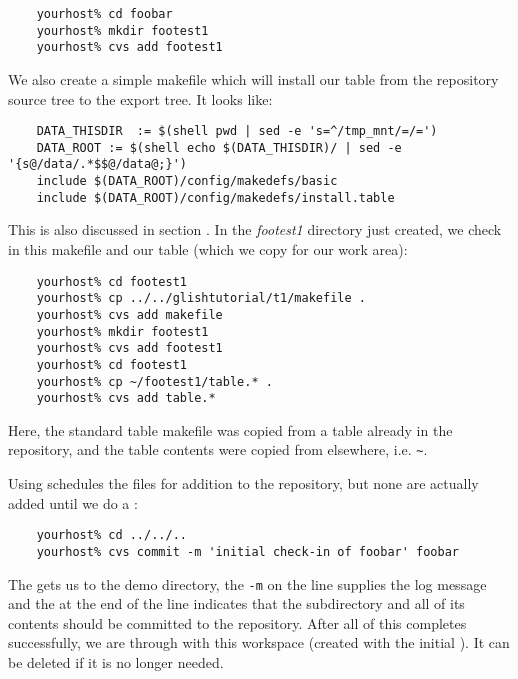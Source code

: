 \begin{verbatim}
    yourhost% cd foobar
    yourhost% mkdir footest1
    yourhost% cvs add footest1
\end{verbatim}

\noindent
We also create a simple makefile which will install our table from the
repository source tree to the export tree. It looks like:

\begin{verbatim}
    DATA_THISDIR  := $(shell pwd | sed -e 's=^/tmp_mnt/=/=')
    DATA_ROOT := $(shell echo $(DATA_THISDIR)/ | sed -e '{s@/data/.*$$@/data@;}')
    include $(DATA_ROOT)/config/makedefs/basic
    include $(DATA_ROOT)/config/makedefs/install.table
\end{verbatim}

\noindent
This is also discussed in section . In
the \textit{footest1} directory just created, we check in this makefile
and our table (which we copy for our work area):

\begin{verbatim}
    yourhost% cd footest1
    yourhost% cp ../../glishtutorial/t1/makefile .
    yourhost% cvs add makefile
    yourhost% mkdir footest1
    yourhost% cvs add footest1
    yourhost% cd footest1
    yourhost% cp ~/footest1/table.* .
    yourhost% cvs add table.*
\end{verbatim}

\noindent
Here, the standard table makefile was copied from a table already in the
repository, and the table contents were copied from elsewhere, i.e.
\verb+~+.

Using  schedules the files for addition to the repository, but
none are actually added until we do a :

\begin{verbatim}
    yourhost% cd ../../..
    yourhost% cvs commit -m 'initial check-in of foobar' foobar
\end{verbatim}

\noindent
The  gets us to the demo directory, the \verb+-m+ on the
 line supplies the log message and the  at the end
of the line indicates that the  subdirectory and all of its 
contents should be committed to the repository. After all of this completes
successfully, we are through with this workspace (created with the initial
). It can be deleted if it is no longer needed.



